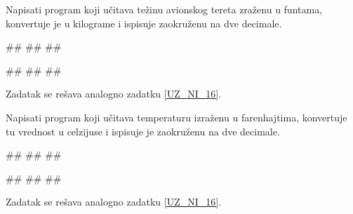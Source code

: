 \begin{Exercise}[label=UZ_NI_18] 
Napisati program koji učitava težinu avionskog tereta zraženu u funtama, konvertuje je u kilograme i ispisuje zaokruženu na dve decimale. 

\begin{miditest}
\begin{upotreba}{1}
#\naslovInt#
##
##
\end{upotreba}
\end{miditest}  
\begin{miditest}
\begin{upotreba}{2}
#\naslovInt#
##
##
\end{upotreba}
\end{miditest}   
\end{Exercise}
\ifresenja
\begin{Answer}[ref=UZ_NI_18]

Zadatak se rešava analogno zadatku \ref{UZ_NI_16}.
\end{Answer}
\fi


\begin{Exercise}[label=UZ_NI_19] 
Napisati program koji učitava temperaturu izraženu u farenhajtima, konvertuje tu vrednost u celzijuse 
i ispisuje je zaokruženu na dve decimale. 
   
\begin{miditest}
\begin{upotreba}{1}
#\naslovInt#
##
##
\end{upotreba}
\end{miditest}  
\begin{miditest}
\begin{upotreba}{2}
#\naslovInt#
##
##
\end{upotreba}
\end{miditest}
\end{Exercise}
\ifresenja
\begin{Answer}[ref=UZ_NI_19]

Zadatak se rešava analogno zadatku \ref{UZ_NI_16}.
\end{Answer}
\fi


